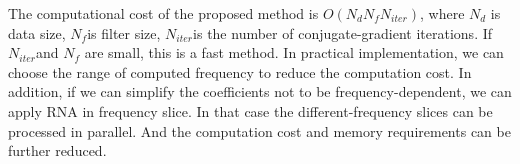 The computational cost of the proposed method is $O\left( {{N}_{d}}{{N}_{f}}{{N}_{iter}} \right)$, 
where ${{N}_{d}}$ is data size, ${{N}_{f}}$is filter size, ${{N}_{iter}}$is the number of 
conjugate-gradient iterations. If ${{N}_{iter}}$and ${{N}_{f}}$ are small, this is a 
fast method. In practical implementation, we can choose the range of computed 
frequency to reduce the computation cost. In addition, if we can simplify the 
coefficients not to be frequency-dependent, we can apply RNA in frequency slice. 
In that case the different-frequency slices can be processed in parallel. 
And the computation cost and memory requirements can be further reduced.

 
  




